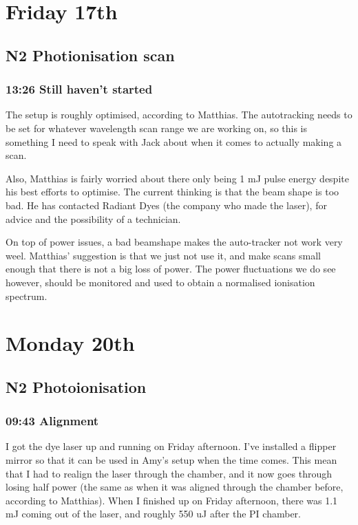 \documentclass[11pt]{article}
\begin{document}
\section*{Friday 17th}
\label{sec-6}
\subsection*{N2 Photionisation scan}
\label{sec-6-1}
\subsubsection*{13:26 Still haven't started}
\label{sec-6-1-1}

The setup is roughly optimised, according to Matthias. The
autotracking needs to be set for whatever wavelength scan range we are
working on, so this is something I need to speak with Jack about when
it comes to actually making a scan.

Also, Matthias is fairly worried about there only being 1 mJ pulse
energy despite his best efforts to optimise. The current thinking is
that the beam shape is too bad. He has contacted Radiant Dyes (the
company who made the laser), for advice and the possibility of a
technician.

On top of power issues, a bad beamshape makes the auto-tracker not
work very weel. Matthias' suggestion is that we just not use it, and
make scans small enough that there is not a big loss of power. The
power fluctuations we do see however, should be monitored and used to
obtain a normalised ionisation spectrum.
\section*{Monday 20th}
\label{sec-7}
\subsection*{N2 Photoionisation}
\label{sec-7-1}
\subsubsection*{09:43 Alignment}
\label{sec-7-1-1}

I got the dye laser up and running on Friday afternoon. I've installed
a flipper mirror so that it can be used in Amy's setup when the time
comes. This mean that I had to realign the laser through the chamber,
and it now goes through losing half power (the same as when it was
aligned through the chamber before, according to Matthias). When I
finished up on Friday afternoon, there was 1.1 mJ coming out of the
laser, and roughly 550 uJ after the PI chamber.
\end{document}

